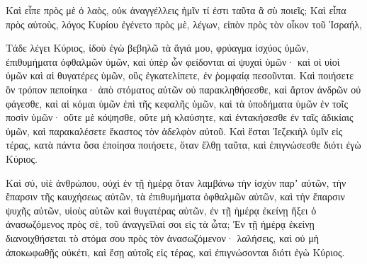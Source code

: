 {Καὶ εἶπε πρὸς μὲ ὁ λαὸς, οὐκ ἀναγγέλλεις ἡμῖν τί ἐστι ταῦτα ἃ σὺ ποιεῖς;
Καὶ εἶπα πρὸς αὐτοὺς, λόγος Κυρίου ἐγένετο πρὸς μὲ, λέγων,
εἰπὸν πρὸς τὸν οἶκον τοῦ Ἰσραήλ,
\par }{\PP Τάδε λέγει Κύριος, ἰδοὺ ἐγὼ βεβηλῶ τὰ ἅγιά μου, φρύαγμα ἰσχύος ὑμῶν, ἐπιθυμήματα ὀφθαλμῶν ὑμῶν, καὶ ὑπὲρ ὧν φείδονται αἱ ψυχαὶ ὑμῶν· καὶ οἱ υἱοὶ ὑμῶν καὶ αἱ θυγατέρες ὑμῶν, οὓς ἐγκατελίπετε, ἐν ῥομφαίᾳ πεσοῦνται.
Καὶ ποιήσετε ὃν τρόπον πεποίηκα· ἀπὸ στόματος αὐτῶν οὐ παρακληθήσεσθε, καὶ ἄρτον ἀνδρῶν οὐ φάγεσθε,
καὶ αἱ κόμαι ὑμῶν ἐπὶ τῆς κεφαλῆς ὑμῶν, καὶ τὰ ὑποδήματα ὑμῶν ἐν τοῖς ποσὶν ὑμῶν· οὔτε μὲ κόψησθε, οὔτε μὴ κλαύσητε, καὶ ἐντακήσεσθε ἐν ταῖς ἀδικίαις ὑμῶν, καὶ παρακαλέσετε ἕκαστος τὸν ἀδελφὸν αὐτοῦ.
Καὶ ἔσται Ἰεζεκιὴλ ὑμῖν εἰς τέρας, κατὰ πάντα ὅσα ἐποίησα ποιήσετε, ὅταν ἔλθῃ ταῦτα, καὶ ἐπιγνώσεσθε διότι ἐγὼ Κύριος.
\par }{\PP {}Καὶ σύ, υἱὲ ἀνθρώπου, οὐχὶ ἐν τῇ ἡμέρᾳ ὅταν λαμβάνω τὴν ἰσχὺν παρʼ αὐτῶν, τὴν ἔπαρσιν τῆς καυχήσεως αὐτῶν, τὰ ἐπιθυμήματα ὀφθαλμῶν αὐτῶν, καὶ τὴν ἔπαρσιν ψυχῆς αὐτῶν, υἱοὺς αὐτῶν καὶ θυγατέρας αὐτῶν,
ἐν τῇ ἡμέρᾳ ἐκείνῃ ἥξει ὁ ἀνασωζόμενος πρὸς σὲ, τοῦ ἀναγγεῖλαί σοι εἰς τὰ ὦτα;
Ἐν τῇ ἡμέρᾳ ἐκείνῃ διανοιχθήσεται τὸ στόμα σου πρὸς τὸν ἀνασωζόμενον· λαλήσεις, καὶ οὐ μὴ ἀποκωφωθῇς οὐκέτι, καὶ ἔσῃ αὐτοῖς εἰς τέρας, καὶ ἐπιγνώσονται διότι ἐγὼ Κύριος.

}
